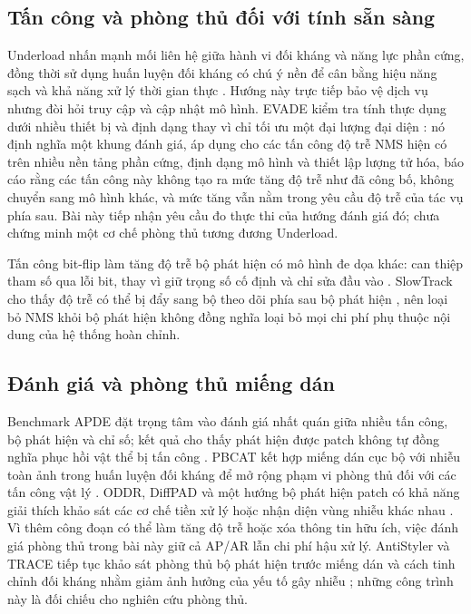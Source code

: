 \documentclass[12pt,a4paper]{article}
\begin{document}
\subsection{Tấn công và phòng thủ đối với tính sẵn sàng}
Underload nhấn mạnh mối liên hệ giữa hành vi đối kháng và năng lực phần cứng, đồng thời sử dụng huấn luyện đối kháng có chú ý nền để cân bằng hiệu năng sạch và khả năng xử lý thời gian thực \cite{underload2025}. Hướng này trực tiếp bảo vệ dịch vụ nhưng đòi hỏi truy cập và cập nhật mô hình. EVADE kiểm tra tính thực dụng dưới nhiều thiết bị và định dạng thay vì chỉ tối ưu một đại lượng đại diện \cite{evade2025}: nó định nghĩa một khung đánh giá, áp dụng cho các tấn công độ trễ NMS hiện có trên nhiều nền tảng phần cứng, định dạng mô hình và thiết lập lượng tử hóa, báo cáo rằng các tấn công này không tạo ra mức tăng độ trễ như đã công bố, không chuyển sang mô hình khác, và mức tăng vẫn nằm trong yêu cầu độ trễ của tác vụ phía sau. Bài này tiếp nhận yêu cầu đo thực thi của hướng đánh giá đó; chưa chứng minh một cơ chế phòng thủ tương đương Underload.

Tấn công bit-flip làm tăng độ trễ bộ phát hiện có mô hình đe dọa khác: can thiệp tham số qua lỗi bit, thay vì giữ trọng số cố định và chỉ sửa đầu vào \cite{bitflip2025}. SlowTrack cho thấy độ trễ có thể bị đẩy sang bộ theo dõi phía sau bộ phát hiện \cite{slowtrack2024}, nên loại bỏ NMS khỏi bộ phát hiện không đồng nghĩa loại bỏ mọi chi phí phụ thuộc nội dung của hệ thống hoàn chỉnh.

\subsection{Đánh giá và phòng thủ miếng dán}
Benchmark APDE đặt trọng tâm vào đánh giá nhất quán giữa nhiều tấn công, bộ phát hiện và chỉ số; kết quả cho thấy phát hiện được patch không tự đồng nghĩa phục hồi vật thể bị tấn công \cite{apde2025}. PBCAT kết hợp miếng dán cục bộ với nhiễu toàn ảnh trong huấn luyện đối kháng để mở rộng phạm vi phòng thủ đối với các tấn công vật lý \cite{pbcat2025}. ODDR, DiffPAD và một hướng bộ phát hiện patch có khả năng giải thích khảo sát các cơ chế tiền xử lý hoặc nhận diện vùng nhiễu khác nhau \cite{oddr2025,diffpad2025,unifiedpatchdet2025}. Vì thêm công đoạn có thể làm tăng độ trễ hoặc xóa thông tin hữu ích, việc đánh giá phòng thủ trong bài này giữ cả AP/AR lẫn chi phí hậu xử lý. AntiStyler và TRACE tiếp tục khảo sát phòng thủ bộ phát hiện trước miếng dán và cách tinh chỉnh đối kháng nhằm giảm ảnh hưởng của yếu tố gây nhiễu \cite{antistyler2026,trace2026}; những công trình này là đối chiếu cho nghiên cứu phòng thủ.
\end{document}
